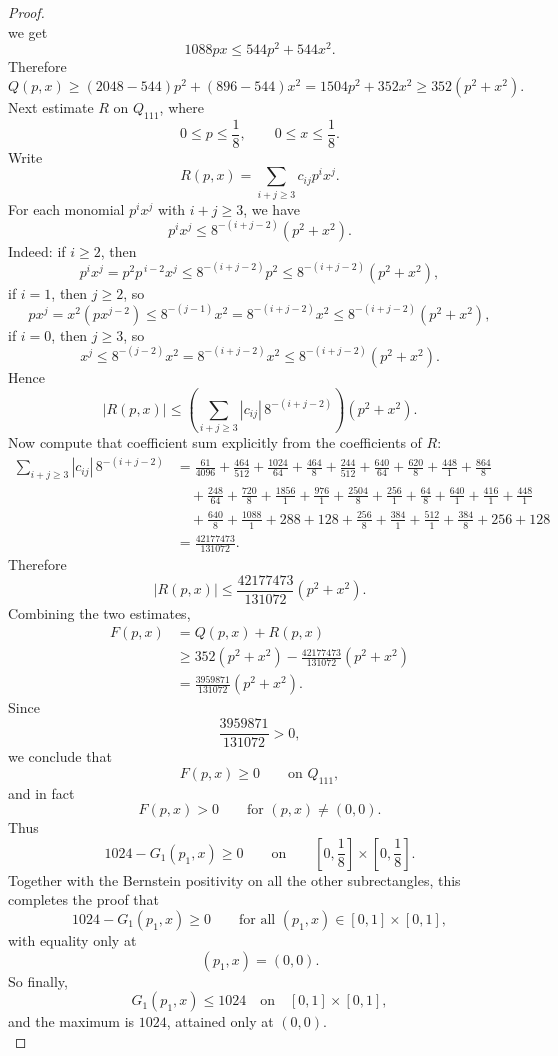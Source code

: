 \documentclass[a4paper,12pt,reqno]{amsart} %
\numberwithin{equation}{section}
\theoremstyle{definition}
\begin{document}
\begin{proof}
\[\]
we get
\[
1088px\le 544p^2+544x^2.
\]
Therefore
\[
Q(p,x)\ge (2048-544)p^2+(896-544)x^2
=1504p^2+352x^2
\ge 352(p^2+x^2).
\]
Next estimate \(R\) on \(Q_{111}\), where
\[
0\le p\le \frac18,\qquad 0\le x\le \frac18.
\]
Write
\[
R(p,x)=\sum_{i+j\ge 3} c_{ij}p^ix^j.
\]
For each monomial \(p^ix^j\) with \(i+j\ge 3\), we have
\[
p^ix^j\le 8^{-(i+j-2)}(p^2+x^2).
\]
Indeed:
if $i \ge 2$, then
\[
p^ix^j=p^2p^{\,i-2}x^j\le 8^{-(i+j-2)}p^2\le 8^{-(i+j-2)}(p^2+x^2),
\]
if $i=1$, then $j\ge 2$, so
\[
p x^j=x^2(px^{j-2})\le 8^{-(j-1)}x^2=8^{-(i+j-2)}x^2\le 8^{-(i+j-2)}(p^2+x^2),
\]
if $i=0$, then $j\ge 3$, so
\[
x^j\le 8^{-(j-2)}x^2=8^{-(i+j-2)}x^2\le 8^{-(i+j-2)}(p^2+x^2).
\]
Hence
\[
|R(p,x)|
\le
\left(\sum_{i+j\ge 3}|c_{ij}|\,8^{-(i+j-2)}\right)(p^2+x^2).
\]
Now compute that coefficient sum explicitly from the coefficients of \(R\):
\[
\begin{aligned}
	\sum_{i+j\ge 3}|c_{ij}|\,8^{-(i+j-2)}
	&=
	\frac{61}{4096}
	+\frac{464}{512}
	+\frac{1024}{64}
	+\frac{464}{8}
	+\frac{244}{512}
	+\frac{640}{64}
	+\frac{620}{8}
	+\frac{448}{1}
	+\frac{864}{8}
	\\
	&\quad
	+\frac{248}{64}
	+\frac{720}{8}
	+\frac{1856}{1}
	+\frac{976}{1}
	+\frac{2504}{8}
	+\frac{256}{1}
	+\frac{64}{8}
	+\frac{640}{1}
	+\frac{416}{1}
	+\frac{448}{1}
	\\
	&\quad
	+\frac{640}{8}
	+\frac{1088}{1}
	+288
	+128
	+\frac{256}{8}
	+\frac{384}{1}
	+\frac{512}{1}
	+\frac{384}{8}
	+256
	+128
	\\
	&=\frac{42177473}{131072}.
\end{aligned}
\]
Therefore
\[
|R(p,x)|\le \frac{42177473}{131072}(p^2+x^2).
\]
Combining the two estimates,
\[
\begin{aligned}
	F(p,x)
	&=Q(p,x)+R(p,x)\\
	&\ge 352(p^2+x^2)-\frac{42177473}{131072}(p^2+x^2)\\
	&=\frac{3959871}{131072}(p^2+x^2).
\end{aligned}
\]
Since
\[
\frac{3959871}{131072}>0,
\]
we conclude that
\[
F(p,x)\ge 0 \qquad \text{on }Q_{111},
\]
and in fact
\[
F(p,x)>0 \qquad \text{for }(p,x)\neq(0,0).
\]
Thus
\[
1024-G_1(p_1,x)\ge 0
\qquad\text{on}\qquad
\left[0,\frac18\right]\times\left[0,\frac18\right].
\]
Together with the Bernstein positivity on all the other subrectangles, this completes the proof that
\[
1024-G_1(p_1,x)\ge 0
\qquad\text{for all }(p_1,x)\in[0,1]\times[0, 1],
\]
with equality only at
\[
(p_1,x)=(0,0).
\]
So finally,
\[
G_1(p_1,x)\le 1024
\quad\text{on}\quad [0,1]\times[0, 1],
\]
and the maximum is \(1024\), attained only at \((0,0)\).\\[2mm]

\end{proof}
\end{document}
